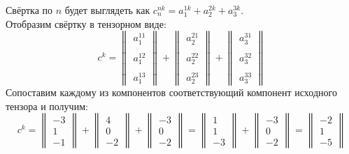 \documentclass{article}
\begin{document}
\begin{center}
Свёртка по $n$ будет выглядеть как $c^{nk}_n = a^{1k}_1 + a^{2k}_2 + a^{3k}_3$. \\
Отобразим свёртку в тензорном виде:
$$c^k = \begin{Vmatrix}
a^{11}_1 \\ \, \\ a^{12}_1 \\ \, \\ a^{13}_1
\end{Vmatrix} + \begin{Vmatrix}
a^{21}_2 \\ \, \\ a^{22}_2 \\ \, \\ a^{23}_2
\end{Vmatrix} + \begin{Vmatrix}
a^{31}_3 \\ \, \\ a^{32}_3 \\ \, \\ a^{33}_3
\end{Vmatrix}$$
Сопоставим каждому из компонентов соответствующий компонент исходного тензора и получим:
$$c^k =\begin{Vmatrix}
-3 \\ 1 \\ -1
\end{Vmatrix} + \begin{Vmatrix}
4 \\ 0 \\ -2
\end{Vmatrix} + \begin{Vmatrix}
-3 \\ 0 \\ -2
\end{Vmatrix} = \begin{Vmatrix}
1 \\ 1 \\ -3
\end{Vmatrix} + \begin{Vmatrix}
-3 \\ 0 \\ -2
\end{Vmatrix} = \begin{Vmatrix}
-2 \\ 1 \\ -5
\end{Vmatrix}$$ 
\end{center}
\end{document}
